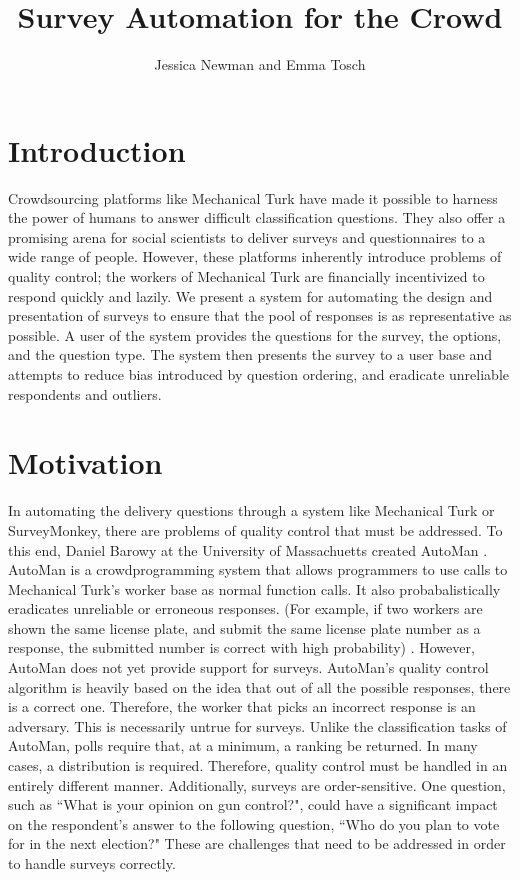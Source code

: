 \documentclass{article}
\begin{document}
\title{Survey Automation for the Crowd}
\author{Jessica Newman and Emma Tosch}
\maketitle
\section{Introduction}
Crowdsourcing platforms like Mechanical Turk have made it possible to harness the power of humans to answer difficult classification questions. They also offer a promising arena for social scientists to deliver surveys and questionnaires to a wide range of people. However, these platforms inherently introduce problems of quality control; the workers of Mechanical Turk are financially incentivized to respond quickly and lazily. We present a system for automating the design and presentation of surveys to ensure that the pool of responses is as representative as possible. A user of the system provides the questions for the survey, the options, and the question type. The system then presents the survey to a user base and attempts to reduce bias introduced by question ordering, and eradicate unreliable respondents and outliers.
\section{Motivation}
In automating the delivery questions through a system like Mechanical Turk or SurveyMonkey, there are problems of quality control that must be addressed. To this end, Daniel Barowy at the University of Massachuetts created AutoMan \cite{automan}. AutoMan is a crowdprogramming system that allows programmers to use calls to Mechanical Turk's worker base as normal function calls. It also probabalistically eradicates unreliable or erroneous responses. (For example, if two workers are shown the same license plate, and submit the same license plate number as a response, the submitted number is correct with high probability) \cite{automan}. However, AutoMan does not yet provide support for surveys. AutoMan's quality control algorithm is heavily based on the idea that out of all the possible responses, there is a correct one. Therefore, the worker that picks an incorrect response is an adversary. This is necessarily untrue for surveys. Unlike the classification tasks of AutoMan, polls require that, at a minimum, a ranking be returned. In many cases, a distribution is required. Therefore, quality control must be handled in an entirely different manner. Additionally, surveys are order-sensitive. One question, such as ``What is your opinion on gun control?", could have a significant impact on the respondent's answer to the following question, ``Who do you plan to vote for in the next election?" These are challenges that need to be addressed in order to handle surveys correctly.
\end{document}
